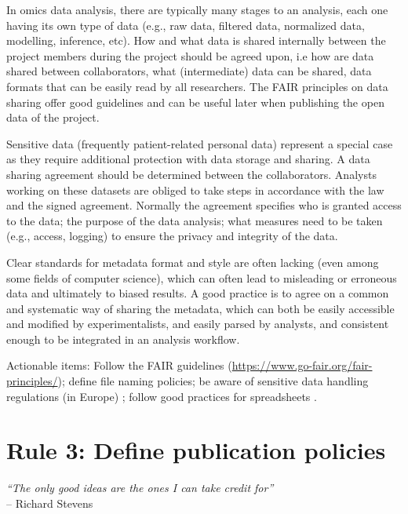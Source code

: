 \documentclass{article}
\begin{document}
In omics data analysis, there are typically many stages to an analysis, each one having its own type of data (e.g., raw data, filtered data, normalized data, modelling, inference, etc). How and what data is shared internally between the project members during the project should be agreed upon, i.e how are data shared between collaborators, what (intermediate) data can be shared, data formats that can be easily read by all researchers. The FAIR principles \cite{wilkinson2016fair} on data sharing offer good guidelines and can be useful later when publishing the open data of the project.

Sensitive data (frequently patient-related personal data) represent a special case as they require additional protection with data storage and sharing.  A data sharing agreement should be determined between the collaborators. Analysts working on these datasets are obliged to take steps in accordance with the law and the signed agreement. Normally the agreement specifies who is granted access to the data; the purpose of the data analysis; what measures need to be taken (e.g., access, logging) to ensure the privacy and integrity of the data. 

Clear standards for metadata format and style are often lacking (even among some fields of computer science), which can often lead to misleading or erroneous data and ultimately to biased results. A good practice is to agree on a common and systematic way of sharing the metadata, which can both be easily accessible and modified by experimentalists, and easily parsed by analysts, and consistent enough to be integrated in an analysis workflow.  

Actionable items: Follow the FAIR guidelines (\url{https://www.go-fair.org/fair-principles/}); define file naming policies; be aware of sensitive data handling regulations (in Europe) \cite{shabani2019reidentifiability,party2011advice}; follow good practices for spreadsheets \cite{broman2018data}.

\section*{Rule 3: Define publication policies} %
\label{rule3_publication}

\begin{flushright}
\rightskip=1cm\textit{``The only good ideas are the ones I can take credit for''} \\
\vspace{.2em}
\rightskip=0cm -- Richard Stevens
\end{flushright}
\end{document}
